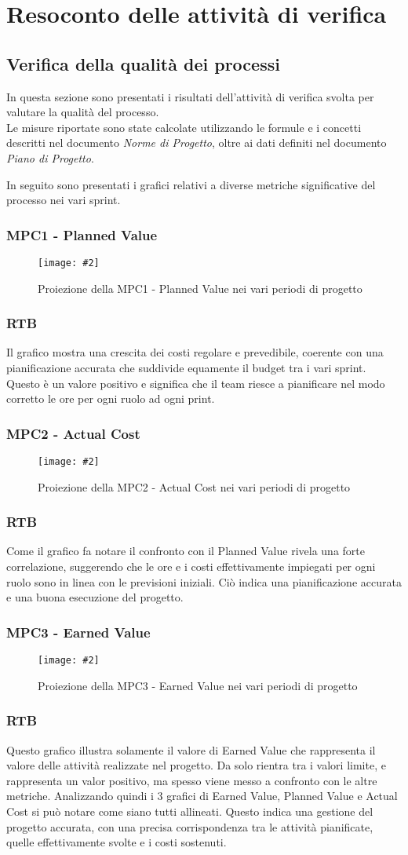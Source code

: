 \newcommand{\Met}[3]{
    \subsubsection{#1}
    \begin{figure}[h!] \centering
        \texttt{[image: \#2]}
        \caption{Proiezione della#1nei vari periodi di progetto}
    \end{figure}
    \subsubsection*{RTB}
    #3
    \newpage
}

\section{Resoconto delle attività di verifica}

\subsection{Verifica della qualità dei processi}
In questa sezione sono presentati i risultati dell'attività di verifica svolta per valutare la qualità del processo.\\
Le misure riportate sono state calcolate utilizzando le formule e i concetti descritti nel documento \textit{Norme di Progetto}, oltre ai dati definiti nel documento \textit{Piano di Progetto}.

In seguito sono presentati i grafici relativi a diverse metriche significative del processo nei vari sprint.

\Met
{ %
    MPC1 - Planned Value
}
{ %
    template/images/PV.png
}
{ %
    Il grafico mostra una crescita dei costi regolare e prevedibile, coerente con una pianificazione accurata che suddivide equamente il budget tra i vari sprint.
    Questo è un valore positivo e significa che il team riesce a pianificare nel modo corretto le ore per ogni ruolo ad ogni print.
}

\Met
{ %
    MPC2 - Actual Cost
}
{ %
    template/images/AC.png
}
{ %
    Come il grafico fa notare il confronto con il Planned Value rivela una forte correlazione, suggerendo che le ore e i costi effettivamente impiegati per ogni ruolo sono in linea con le previsioni iniziali.
    Ciò indica una pianificazione accurata e una buona esecuzione del progetto.
}

\Met
{ %
    MPC3 - Earned Value
}
{ %
    template/images/EV.png
}
{ %
    Questo grafico illustra solamente il valore di Earned Value che rappresenta il valore delle attività realizzate nel progetto.
    Da solo rientra tra i valori limite, e rappresenta un valor positivo, ma spesso viene messo a confronto con le altre metriche.
    Analizzando quindi i 3 grafici di Earned Value, Planned Value e Actual Cost si può notare come siano tutti allineati. 
    Questo indica una gestione del progetto accurata, con una precisa corrispondenza tra le attività pianificate, quelle effettivamente svolte e i costi sostenuti.
}

